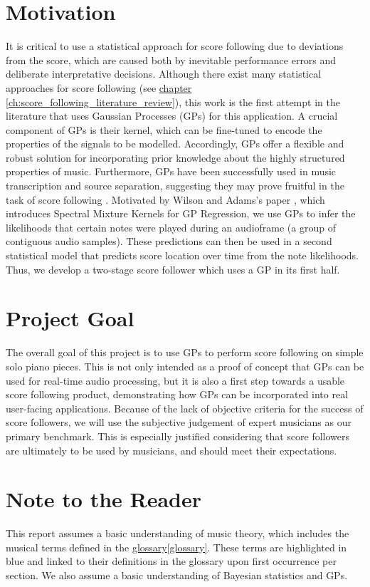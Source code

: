 \section{Motivation}
It is critical to use a statistical approach for score following due to deviations from the score, which are caused both by inevitable performance errors and deliberate interpretative decisions. Although there exist many statistical approaches for score following (see \hyperref[ch:score_following_literature_review]{chapter \ref*{ch:score_following_literature_review}}), this work is the first attempt in the literature that uses Gaussian Processes (GPs) for this application. A crucial component of GPs is their kernel, which can be fine-tuned to encode the properties of the signals to be modelled. Accordingly, GPs offer a flexible and robust solution for incorporating prior knowledge about the highly structured properties of music. Furthermore, GPs have been successfully used in music transcription and source separation, suggesting they may prove fruitful in the task of score following \cite{miscdo_2019_sparse}. Motivated by Wilson and Adams’s paper \cite{wilson_2013_gaussian}, which introduces Spectral Mixture Kernels for GP Regression, we use GPs to infer the likelihoods that certain notes were played during an audioframe (a group of contiguous audio samples). These predictions can then be used in a second statistical model that predicts score location over time from the note likelihoods. Thus, we develop a two-stage score follower which uses a GP in its first half.

\section{Project Goal}{\label{section:project_goal}}
The overall goal of this project is to use GPs to perform score following
on simple solo piano pieces. This is not only intended as a proof of concept that GPs can be used for real-time audio processing, but it is also a first step towards a usable score following product, demonstrating how GPs can be incorporated into real user-facing applications. Because of the lack of objective criteria for the success of score followers, we will use the subjective judgement of expert musicians as our primary benchmark. This is especially justified considering that score followers are ultimately to be used by musicians, and should meet their expectations. 

\section{Note to the Reader}
This report assumes a basic understanding of music theory, which includes the musical terms defined in the \hyperref[glossary]{glossary\ref*{glossary}}. These terms are highlighted in blue and linked to their definitions in the glossary upon first occurrence per section. We also assume a basic understanding of Bayesian statistics and GPs. 